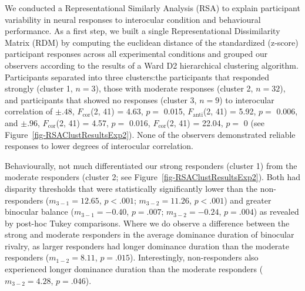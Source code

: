\documentclass[
  12pt,
]{article}
\begin{document}
We conducted a Representational Similarly Analysis (RSA) to explain
participant variability in neural responses to interocular condition and
behavioural performance. As a first step, we built a single
Representational Dissimilarity Matrix (RDM) by computing the euclidean
distance of the standardized (z-score) participant responses across all
experimental conditions and grouped our observers according to the
results of a Ward D2 hierarchical clustering algorithm. Participants
separated into three clusters:the participants that responded strongly
(cluster 1, \(n = 3\)), those with moderate responses (cluster 2,
\(n = 32\)), and participants that showed no responses (cluster 3,
\(n = 9\)) to interocular correlation of \(\pm .48\),
\(F_\text{cor}\)(2, 41) = 4.63, \(p=\) 0.015, \(F_\text{anti}\)(2, 41) =
5.92, \(p=\) 0.006, and \(\pm .96\), \(F_\text{cor}\)(2, 41) = 4.57,
\(p=\) 0.016, \(F_\text{cor}\)(2, 41) = 22.04, \(p=\) 0 (see
Figure~\ref{fig-RSAClustResultsExp2}). None of the observers
demonstrated reliable responses to lower degrees of interocular
correlation.

Behaviourally, not much differentiated our strong responders (cluster 1)
from the moderate responders (cluster 2; see
Figure~\ref{fig-RSAClustResultsExp2}). Both had disparity thresholds
that were statistically significantly lower than the non-responders
(\(m_{3-1} = 12.65\), \(p < .001\); \(m_{3-2} = 11.26\), \(p < .001\))
and greater binocular balance (\(m_{3-1} = -0.40\), \(p = .007\);
\(m_{3-2} = -0.24\), \(p = .004\)) as revealed by post-hoc Tukey
comparisons. Where we do observe a difference between the strong and
moderate responders in the average dominance duration of binocular
rivalry, as larger responders had longer dominance duration than the
moderate responders (\(m_{1-2} = 8.11\), \(p = .015\)). Interestingly,
non-responders also experienced longer dominance duration than the
moderate responders (\(m_{3-2} = 4.28\), \(p = .046\)).
\end{document}
